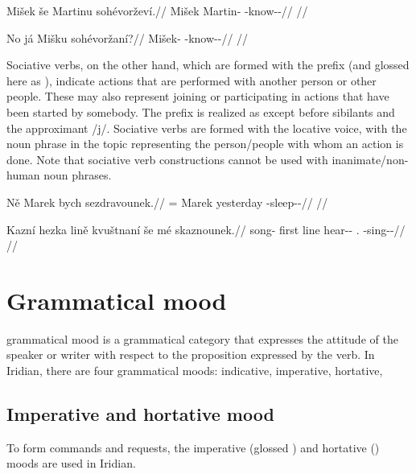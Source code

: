\pex
\begingl
\gla Mišek še Martinu sohévorževí.//
\glb Mišek \Com{} Martin-\Ins{} \Rec{}-know-\Av{}-\Cont{}//
\glft {}//
\endgl
\xe

\pex
\begingl
\gla No já Mišku sohévoržaní?//
\glb \Q{}  Mišek-\Ins{} \Rec{}-know-\Av{}-\Ret{}//
\glft {}//
\endgl
\xe

Sociative verbs, on the other hand, which are formed with
the prefix  (and glossed here as \Soc{}), indicate actions that are
performed with another person or other people. These may also represent joining
or participating in actions that have been started by somebody. The prefix
 is realized as  except before sibilants and the approximant
/j/. Sociative verbs are formed with the locative voice, with the noun phrase in
the topic representing the person/people with whom an action is done. Note that
sociative verb constructions cannot be used with inanimate/non-human noun
phrases.

\pex
\begingl
\gla Ně Marek bych sezdravounek.//
\glb \Pl{}= Marek yesterday \Soc{}-sleep-\Lv{}-\Pf{}//
\glft {}//
\endgl
\xe

\pex
\begingl
\gla Kazní hezka lině kvuštnaní še m\'e skaznounek.//
\glb song-\Gen{} first line hear-\Pv{}-\Ret{} \Com{} \First\Pl{}.\Str{} \Soc{}-sing-\Lv{}-\Pf{}//
\glft {}//
\endgl
\xe

\section{Grammatical mood}\label{sec:mood}

{\sc grammatical mood} is a grammatical category that expresses the attitude of the speaker or writer with respect to the proposition expressed by the verb. In Iridian, there are four grammatical moods: indicative, imperative, hortative,


\subsection{Imperative and hortative
mood}\label{sec:imp-hort}

To form commands and requests, the imperative
(glossed ) and hortative () moods are used in Iridian.

